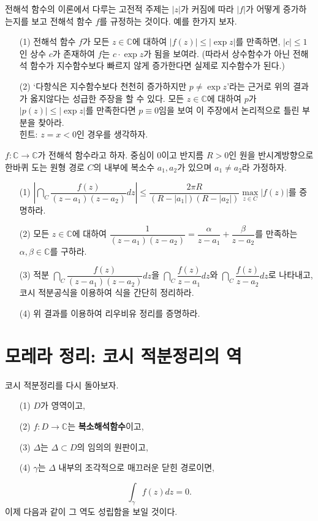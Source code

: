 \begin{salt_exercise} \label{ex-3-33}
전해석 함수의 이론에서 다루는 고전적 주제는
$|z|$가 커짐에 따라 $|f|$가 어떻게 증가하는지를 보고 전해석 함수 $f$를 규정하는 것이다.
예를 한가지 보자.
\begin{itemize}
\item[(1)] 전해석 함수 $f$가 모든 $z\in\mathbb C$에 대하여 
$|f(z)| \le |\exp z|$를 만족하면, 
$|c|\le1$인 상수 $c$가 존재하여 $f$는 $c\cdot \exp z$가 됨을 보여라.
(따라서 상수함수가 아닌 전해석 함수가 지수함수보다 빠르지 않게 증가한다면
실제로 지수함수가 된다.)
\item[(2)] `다항식은 지수함수보다 천천히 증가하지만 $p\ne \exp z$'라는 근거로
위의 결과가 옳지않다는 성급한 주장을 할 수 있다.
모든 $z\in\mathbb C$에 대하여 $p$가 $|p(z)|\le |\exp z|$를 만족한다면
$p\equiv0$임을 보여 이 주장에서 논리적으로 틀린 부분을 찾아라. \\
힌트: $z=x<0$인 경우를 생각하자.
\end{itemize}
\end{salt_exercise}

\begin{salt_exercise} \label{ex-3-34}
$f:\mathbb C \to \mathbb C$가 전해석 함수라고 하자.
중심이 $0$이고 반지름 $R>0$인 원을 반시계방향으로 한바퀴 도는 원형 경로 $C$의
내부에 복소수 $a_1, a_2$가 있으며 $a_1\ne a_2$라 가정하자.
\begin{itemize}
\item[(1)] $\left| \dint_C \dfrac{f(z)}{(z-a_1)(z-a_2)}dz \right| \le
\dfrac{2\pi R}{(R-|a_1|)(R-|a_2|)} \max\limits_{z\in C} |f(z)|$를 증명하라.
\item[(2)] 모든 $z\in \mathbb C$에 대하여
$\dfrac1{(z-a_1)(z-a_2)} = \dfrac\alpha{z-a_1} + \dfrac\beta{z-a_2}$를 만족하는
$\alpha, \beta \in \mathbb C$를 구하라.
\item[(3)] 적분 $\dint_C \dfrac{f(z)}{(z-a_1)(z-a_2)}dz$을
$\dint_C \dfrac{f(z)}{z-a_1}dz$와 $\dint_C \dfrac{f(z)}{z-a_2}dz$로 나타내고,
코시 적분공식을 이용하여 식을 간단히 정리하라.
\item[(4)] 위 결과를 이용하여 리우비유 정리를 증명하라.
\end{itemize}
\end{salt_exercise}

\section{모레라 정리: 코시 적분정리의 역}

 코시 적분정리를 다시 돌아보자.
\begin{itemize}
\item[(1)] $D$가 영역이고, 
\item[(2)] $f:D\to \mathbb C$는 \textbf{복소해석함수}이고,
\item[(3)] $\Delta$는 $\Delta \subset D$의 임의의 원판이고,
\item[(4)] $\gamma$는 $\Delta$ 내부의 조각적으로 매끄러운 닫힌 경로이면,
\end{itemize}
\[
\int_\gamma f(z)dz = 0.
\]
이제 다음과 같이 그 역도 성립함을 보일 것이다.

